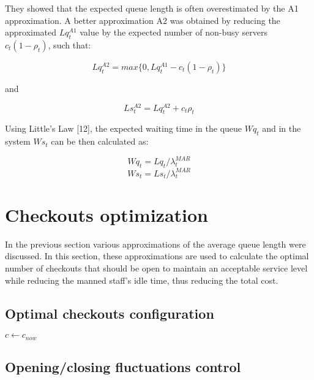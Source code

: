 They showed that the expected queue length is often overestimated by the A1 approximation. A better approximation A2 was obtained by reducing the approximated $ Lq_t^{A1} $ value by the expected number of non-busy servers $ c_t (1 - \rho_t) $, such that:

$$ Lq_t^{A2} = max\{0, Lq_t^{A1} - c_t (1 - \rho_t)\} $$

and

$$ Ls_t^{A2} = Lq_t^{A2} + c_t \rho_t $$

Using Little’s Law [12], the expected waiting time in the queue $ Wq_t $ and in the system $ Ws_t $ can be then calculated as:

$$ Wq_t = Lq_t / \lambda^{MAR}_t $$
$$ Ws_t = Ls_t / \lambda^{MAR}_t $$


\section{Checkouts optimization}
\label{sec:checkouts_optimization}
In the previous section various approximations of the average queue length were discussed. In this section, these approximations are used to calculate the optimal number of checkouts that should be open to maintain an acceptable service level while reducing the manned staff’s idle time, thus reducing the total cost.

\subsection{Optimal checkouts configuration}
\label{subsec:optimal_checkouts_configuration}

\begin{algorithm}[H]
  $ c \gets c_{now}$\;
\end{algorithm}


\subsection{Opening/closing fluctuations control}
\label{subsec:opening_closing_fluctuations_control}

